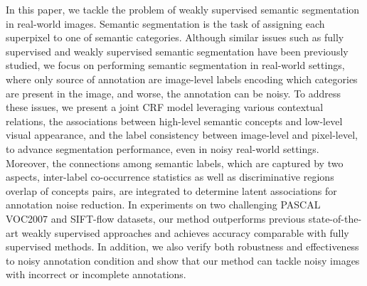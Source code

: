 \if
In this paper, we tackle the problem of weakly supervised semantic segmentation in real-world images. Semantic segmentation is the task of assigning each superpixel to one of semantic categories. Although similar issues such as fully supervised and weakly supervised semantic segmentation have been previously studied, we focus on performing semantic segmentation in real-world settings, where only source of annotation are image-level labels encoding which categories are present in the image, and worse, the annotation can be noisy. To address these issues, we present a joint CRF model leveraging various contextual relations, \eg the associations between high-level semantic concepts and low-level visual appearance, and the label consistency between image-level and pixel-level, to advance segmentation performance, even in noisy real-world settings. Moreover, the connections among semantic labels, which are captured by two aspects, inter-label co-occurrence statistics as well as discriminative regions overlap of concepts pairs, are integrated to determine latent associations for annotation noise reduction. In experiments on two challenging PASCAL VOC2007 and SIFT-flow datasets, our method outperforms previous state-of-the-art weakly supervised approaches and achieves accuracy comparable with fully supervised methods. In addition, we also verify both robustness and effectiveness to noisy annotation condition and show that our method can tackle noisy images with incorrect or incomplete annotations.
\fi